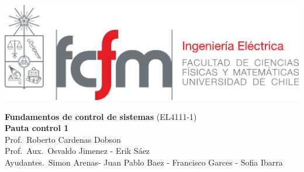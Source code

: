 \documentclass[
  11pt,
  letterpaper,
   addpoints,
   answers
  ]{exam}
\begin{document}
\noindent
\begin{minipage}{0.47\textwidth}
\includegraphics[width=\textwidth]{../fcfm_die}
\end{minipage}
\begin{minipage}{0.53\textwidth}
\begin{center} 
\large\textbf{Fundamentos de control de sistemas} (EL4111-1) \\
\large\textbf{Pauta control 1} \\
\small Prof.~Roberto Cardenas Dobson\\
\small Prof.~Aux.~Osvaldo Jimenez - Erik Sáez\\
\small Ayudantes.~Simon Arenas- Juan Pablo Baez - Francisco Garces - Sofia Ibarra\\
\end{center}
\end{minipage}

\vspace{0.5cm}
\noindent
\vspace{.85cm}
\end{document}
